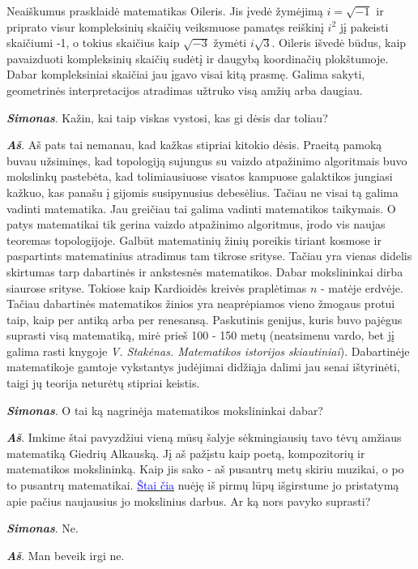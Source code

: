 \documentclass[a4paper]{article}
\newcommand{\goto}[2]{\href{\detokenize{#1}}{\textcolor{blue}{#2}}}
\newcommand{\say}[1]{\textbf{\textit{#1}}}
\begin{document}
Neaiškumus prasklaidė matematikas Oileris. Jis įvedė žymėjimą $i=\sqrt{-1}$ ir priprato visur kompleksinių skaičių veiksmuose pamatęs reiškinį $i^2$ jį pakeisti skaičiumi -1, o tokius skaičius kaip $\sqrt{-3}$ žymėti $i\sqrt{3}$. Oileris išvedė būdus, kaip pavaizduoti kompleksinių skaičių sudėtį ir daugybą koordinačių plokštumoje. Dabar kompleksiniai skaičiai jau įgavo visai kitą prasmę. Galima sakyti, geometrinės interpretacijos atradimas užtruko visą amžių arba daugiau.
 
 \say{Simonas}. Kažin, kai taip viskas vystosi, kas gi dėsis dar toliau?
 
 \say{Aš}. Aš pats tai nemanau, kad kažkas stipriai kitokio dėsis. Praeitą pamoką buvau užsiminęs, kad topologiją sujungus su vaizdo atpažinimo algoritmais buvo mokslinkų pastebėta, kad tolimiausiuose visatos kampuose galaktikos jungiasi kažkuo, kas panašu į gijomis susipynusius debesėlius. Tačiau ne visai tą galima vadinti matematika. Jau greičiau tai galima vadinti matematikos taikymais. O patys matematikai tik gerina vaizdo atpažinimo algoritmus, įrodo vis naujas teoremas topologijoje. Galbūt matematinių žinių poreikis tiriant kosmose ir paspartints matematinius atradimus tam tikrose srityse. Tačiau yra vienas didelis skirtumas tarp dabartinės ir ankstesnės matematikos. Dabar mokslininkai dirba siaurose srityse. Tokiose kaip Kardioidės kreivės praplėtimas $n$ - matėje erdvėje. Tačiau dabartinės matematikos žinios yra neaprėpiamos vieno žmogaus protui taip, kaip per antiką arba per renesansą. Paskutinis genijus, kuris buvo pajėgus suprasti visą matematiką, mirė prieš 100 - 150 metų (neatsimenu vardo, bet jį galima rasti knygoje \textit{V. Stakėnas. Matematikos istorijos skiautiniai}). Dabartinėje matematikoje gamtoje vykstantys judėjimai didžiąja dalimi jau senai ištyrinėti, taigi jų teorija neturėtų stipriai keistis.
 
 \say{Simonas}. O tai ką nagrinėja matematikos mokslininkai dabar?
 
 \say{Aš}. Imkime štai pavyzdžiui vieną mūsų šalyje sėkmingiausių tavo tėvų amžiaus matematiką Giedrių Alkauską. Jį aš pažįstu kaip poetą, kompozitorių ir matematikos mokslininką. Kaip jis sako - aš pusantrų metų skiriu muzikai, o po to pusantrų matematikai. \goto{https://www.facebook.com/giedrius.alkauskas/posts/1327817344001999}{Štai čia} nuėję iš pirmų lūpų išgirstume jo pristatymą apie pačius naujausius jo mokslinius darbus. Ar ką nors pavyko suprasti?
 
 \say{Simonas}. Ne.
 
 \say{Aš}. Man beveik irgi ne.
\end{document}
